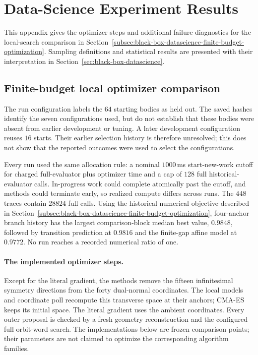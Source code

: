 \section{Data-Science Experiment Results}\label{app:datascience-results}

This appendix gives the optimizer steps and additional failure diagnostics
for the local-search comparison in
Section~\ref{subsec:black-box-datascience-finite-budget-optimization}.
Sampling definitions and statistical results are presented with their
interpretation in Section~\ref{sec:black-box-datascience}.

\subsection{Finite-budget local optimizer comparison}

The run configuration labels the \(64\) starting bodies as held out.
The saved hashes identify the seven configurations used, but do not establish
that these bodies were absent from earlier development or tuning. A later
development configuration reuses \(16\) starts. Their earlier selection history
is therefore unresolved; this does not show that the reported outcomes were
used to select the configurations.

Every run used the same allocation rule: a nominal \(1000\)\,ms
start-new-work cutoff for charged full-evaluator plus optimizer time and a cap
of \(128\) full historical-evaluator calls.  In-progress work could complete
atomically past the cutoff, and methods could terminate early, so realized
compute differs across runs.  The \(448\) traces contain \(28824\) full calls.
Using the historical numerical objective described in
Section~\ref{subsec:black-box-datascience-finite-budget-optimization},
four-anchor branch history has the largest comparison-block median best value,
\(0.9848\), followed by transition prediction at \(0.9816\) and the finite-gap
affine model at \(0.9772\).  No run reaches
a recorded numerical ratio of one.

\paragraph{The implemented optimizer steps.}
Except for the literal gradient, the methods remove the fifteen infinitesimal
symmetry directions from the forty dual-normal coordinates. The local models
and coordinate poll recompute this transverse space at their anchors;
CMA-ES keeps its initial space. The literal gradient uses the ambient
coordinates.  Every
outer proposal is checked by a fresh geometry reconstruction and the
configured full orbit-word search.  The implementations below are frozen
comparison points; their parameters are not claimed to optimize the
corresponding algorithm families.

